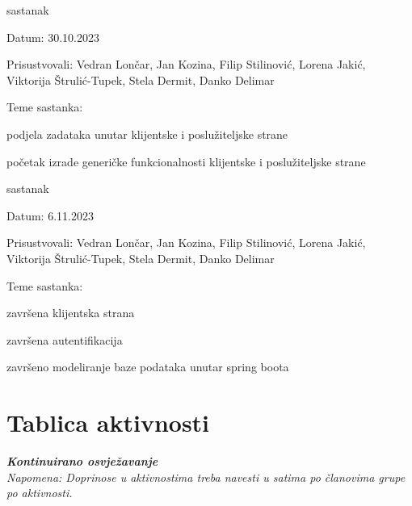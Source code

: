 \begin{packed_enum}
			\item  sastanak
			\item[] \begin{packed_item}
				\item Datum: 30.10.2023
				\item Prisustvovali: Vedran Lončar, Jan Kozina, Filip Stilinović, Lorena Jakić, Viktorija Štrulić-Tupek, Stela Dermit, Danko Delimar
				\item Teme sastanka:
				\begin{packed_item}
					\item  podjela zadataka unutar klijentske i poslužiteljske strane
					\item  početak izrade generičke funkcionalnosti klijentske i poslužiteljske strane
				\end{packed_item}
			\end{packed_item}
			
			\item  sastanak
			\item[] \begin{packed_item}
				\item Datum: 6.11.2023
				\item Prisustvovali: Vedran Lončar, Jan Kozina, Filip Stilinović, Lorena Jakić, Viktorija Štrulić-Tupek, Stela Dermit, Danko Delimar
				\item Teme sastanka:
				\begin{packed_item}
					\item  završena klijentska strana
					\item  završena autentifikacija
					\item  završeno modeliranje baze podataka unutar spring boota
				\end{packed_item}
			\end{packed_item}
			
			
		\end{packed_enum}
		
		\eject
		\section*{Tablica aktivnosti}
		
			\textbf{\textit{Kontinuirano osvježavanje}}\\
			
			 \textit{Napomena: Doprinose u aktivnostima treba navesti u satima po članovima grupe po aktivnosti.}

